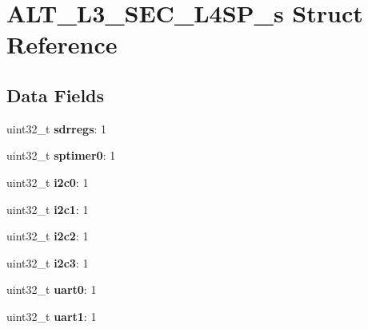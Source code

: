 \hypertarget{structALT__L3__SEC__L4SP__s}{}\section{A\+L\+T\+\_\+\+L3\+\_\+\+S\+E\+C\+\_\+\+L4\+S\+P\+\_\+s Struct Reference}
\label{structALT__L3__SEC__L4SP__s}
\subsection*{Data Fields}
\begin{DoxyCompactItemize}
\item 
\mbox{\label{structALT__L3__SEC__L4SP__s_acec17d05547b73be374675fdb83fd741}} 
uint32\+\_\+t {\bfseries sdrregs}\+: 1
\item 
\mbox{\label{structALT__L3__SEC__L4SP__s_a13db06ec3fb41b323897ace2f044ec06}} 
uint32\+\_\+t {\bfseries sptimer0}\+: 1
\item 
\mbox{\label{structALT__L3__SEC__L4SP__s_a24ee53ffd95eee4bfb2e4d00f073a845}} 
uint32\+\_\+t {\bfseries i2c0}\+: 1
\item 
\mbox{\label{structALT__L3__SEC__L4SP__s_af3d1eeae0488af1bac16dfb446a579fb}} 
uint32\+\_\+t {\bfseries i2c1}\+: 1
\item 
\mbox{\label{structALT__L3__SEC__L4SP__s_ac1dcd31fe1925875f2fceb61535640e0}} 
uint32\+\_\+t {\bfseries i2c2}\+: 1
\item 
\mbox{\label{structALT__L3__SEC__L4SP__s_af99ed415d5fbc4c297f35ae201102079}} 
uint32\+\_\+t {\bfseries i2c3}\+: 1
\item 
\mbox{\label{structALT__L3__SEC__L4SP__s_ac0e7ac58c0b71e46f9466eb264a59b0b}} 
uint32\+\_\+t {\bfseries uart0}\+: 1
\item 
\mbox{\label{structALT__L3__SEC__L4SP__s_aa66c4adb69640d8b35408bd074110afb}} 
uint32\+\_\+t {\bfseries uart1}\+: 1
\item 
\mbox{\label{structALT__L3__SEC__L4SP__s_a9b459d60257a77240e617f393dcdcf2c}} 

\end{DoxyCompactItemize}
